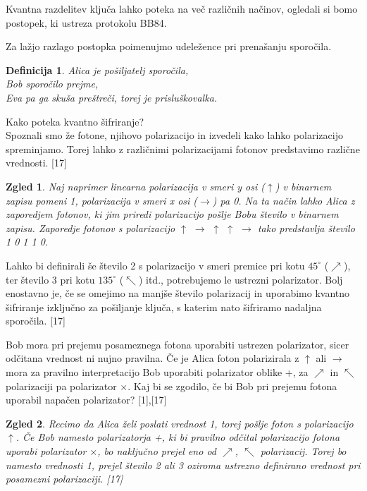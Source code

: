 \documentclass[A4paper, 11pt]{article}
\newtheorem{definicija}{Definicija}
\newtheorem{zgled}{Zgled}
\begin{document}
Kvantna razdelitev ključa lahko poteka na več različnih načinov, ogledali si bomo postopek, ki ustreza protokolu BB84.

Za lažjo razlago postopka poimenujmo udeležence pri prenašanju sporočila.
\begin{definicija}
Alica je pošiljatelj sporočila,\\
Bob sporočilo prejme,\\
Eva pa ga skuša preštreči, torej je prisluškovalka.
\end{definicija}

Kako poteka kvantno šifriranje?\\
Spoznali smo že fotone, njihovo polarizacijo in izvedeli kako lahko polarizacijo spreminjamo. Torej lahko z različnimi polarizacijami fotonov predstavimo različne vrednosti. [17]

\begin{zgled}
Naj naprimer linearna polarizacija v smeri y osi ($\uparrow$) v binarnem zapisu pomeni 1, polarizacija v smeri x osi ($\rightarrow$) pa 0. Na ta način lahko Alica z zaporedjem fotonov, ki jim priredi polarizacijo pošlje Bobu število v binarnem zapisu. Zaporedje fotonov s polarizacijo $\uparrow$ $\rightarrow$ $\uparrow$ $\uparrow$ $\rightarrow$ tako predstavlja število 1 0 1 1 0.
\end{zgled}

Lahko bi definirali še število 2 s polarizacijo v smeri premice pri kotu $45^{\circ}$ ($\nearrow$), ter število 3 pri kotu $135^{\circ}$ ($\nwarrow$) itd., potrebujemo le ustrezni polarizator. Bolj enostavno je, če se omejimo na manjše število polarizacij in uporabimo kvantno šifriranje izključno za pošiljanje ključa, s katerim nato šifriramo nadaljna sporočila. [17]

Bob mora pri prejemu posameznega fotona uporabiti ustrezen polarizator, sicer odčitana vrednost ni nujno pravilna. Če je Alica foton polarizirala z $\uparrow$ ali $\rightarrow$ mora za pravilno interpretacijo Bob uporabiti polarizator oblike +, za $\nearrow$ in $\nwarrow$ polarizaciji pa polarizator $\times$. Kaj bi se zgodilo, če bi Bob pri prejemu fotona uporabil napačen polarizator? [1],[17]

\begin{zgled}
Recimo da Alica želi poslati vrednost 1, torej pošlje foton s polarizacijo $\uparrow$. Če Bob namesto polarizatorja +, ki bi pravilno odčital polarizacijo fotona uporabi polarizator $\times$, bo naključno prejel eno od $\nearrow$, $\nwarrow$ polarizacij. Torej bo namesto vrednosti 1, prejel število 2 ali 3 oziroma ustrezno definirano vrednost pri posamezni polarizaciji.  [17]
\end{zgled}
\end{document}
